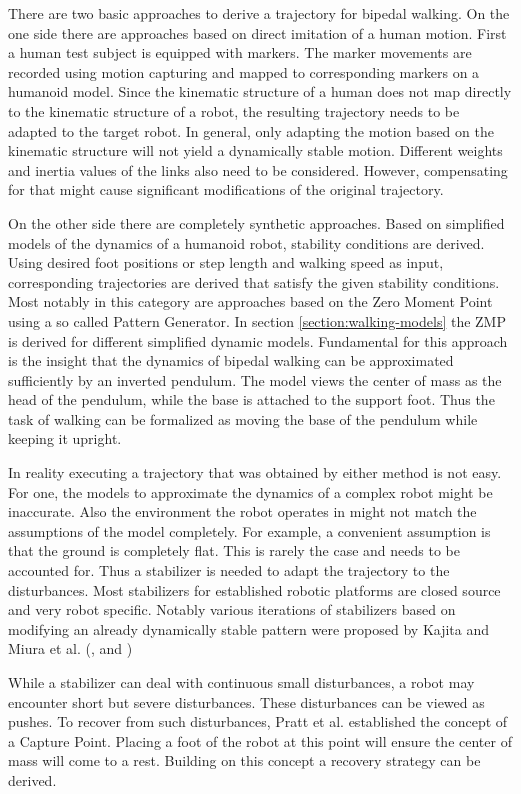 \documentclass[english,ngerman]{KITreprt}
\begin{document}
There are two basic approaches to derive a trajectory for bipedal
walking. On the one side there are approaches based on direct imitation
of a human motion. First a human test subject is equipped with markers.
The marker movements are recorded using motion capturing and mapped to
corresponding markers on a humanoid model. Since the kinematic structure
of a human does not map directly to the kinematic structure of a robot,
the resulting trajectory needs to be adapted to the target robot. In
general, only adapting the motion based on the kinematic structure will
not yield a dynamically stable motion. Different weights and inertia
values of the links also need to be considered. However, compensating
for that might cause significant modifications of the original
trajectory.

On the other side there are completely synthetic approaches. Based on
simplified models of the dynamics of a humanoid robot, stability
conditions are derived. Using desired foot positions or step length and
walking speed as input, corresponding trajectories are derived that
satisfy the given stability conditions. Most notably in this category
are approaches based on the Zero Moment Point using a so called Pattern
Generator. In section \ref{section:walking-models} the ZMP is derived
for different simplified dynamic models. Fundamental for this approach
is the insight that the dynamics of bipedal walking can be approximated
sufficiently by an inverted pendulum. The model views the center of mass
as the head of the pendulum, while the base is attached to the support
foot. Thus the task of walking can be formalized as moving the base of
the pendulum while keeping it upright.

In reality executing a trajectory that was obtained by either method is
not easy. For one, the models to approximate the dynamics of a complex
robot might be inaccurate. Also the environment the robot operates in
might not match the assumptions of the model completely. For example, a
convenient assumption is that the ground is completely flat. This is
rarely the case and needs to be accounted for. Thus a stabilizer is
needed to adapt the trajectory to the disturbances. Most stabilizers for
established robotic platforms are closed source and very robot specific.
Notably various iterations of stabilizers based on modifying an already
dynamically stable pattern were proposed by Kajita and Miura et al.
(\cite{kajita2010biped}, \cite{miura2011human} and
\cite{kajita2012evaluation})

While a stabilizer can deal with continuous small disturbances, a robot
may encounter short but severe disturbances. These disturbances can be
viewed as pushes. To recover from such disturbances, Pratt et al.
established the concept of a Capture Point. Placing a foot of the robot
at this point will ensure the center of mass will come to a rest.
Building on this concept a recovery strategy can be derived.
\end{document}
